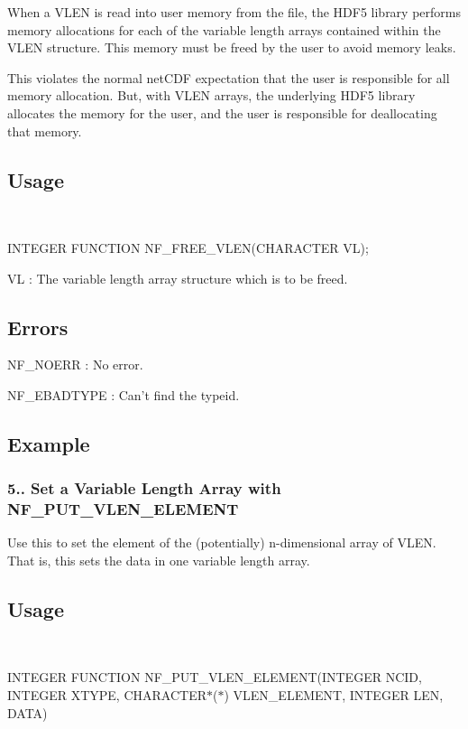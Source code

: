 When a V\+L\+EN is read into user memory from the file, the H\+D\+F5 library performs memory allocations for each of the variable length arrays contained within the V\+L\+EN structure. This memory must be freed by the user to avoid memory leaks.

This violates the normal net\+C\+DF expectation that the user is responsible for all memory allocation. But, with V\+L\+EN arrays, the underlying H\+D\+F5 library allocates the memory for the user, and the user is responsible for deallocating that memory.

\subsection*{Usage }

 

I\+N\+T\+E\+G\+ER F\+U\+N\+C\+T\+I\+ON N\+F\+\_\+\+F\+R\+E\+E\+\_\+\+V\+L\+E\+N(\+C\+H\+A\+R\+A\+C\+T\+E\+R V\+L);

{\ttfamily VL} \+: The variable length array structure which is to be freed.

\subsection*{Errors }

{\ttfamily N\+F\+\_\+\+N\+O\+E\+RR} \+: No error.

{\ttfamily N\+F\+\_\+\+E\+B\+A\+D\+T\+Y\+PE} \+: Can’t find the typeid.

\subsection*{Example }

\subsubsection*{5.. Set a Variable Length Array with N\+F\+\_\+\+P\+U\+T\+\_\+\+V\+L\+E\+N\+\_\+\+E\+L\+E\+M\+E\+NT}

Use this to set the element of the (potentially) n-\/dimensional array of V\+L\+EN. That is, this sets the data in one variable length array.

\subsection*{Usage }

 

I\+N\+T\+E\+G\+ER F\+U\+N\+C\+T\+I\+ON N\+F\+\_\+\+P\+U\+T\+\_\+\+V\+L\+E\+N\+\_\+\+E\+L\+E\+M\+E\+NT(I\+N\+T\+E\+G\+ER N\+C\+ID, I\+N\+T\+E\+G\+ER X\+T\+Y\+PE, C\+H\+A\+R\+A\+C\+T\+E\+R$\ast$($\ast$) V\+L\+E\+N\+\_\+\+E\+L\+E\+M\+E\+NT, I\+N\+T\+E\+G\+ER L\+EN, D\+A\+TA)

